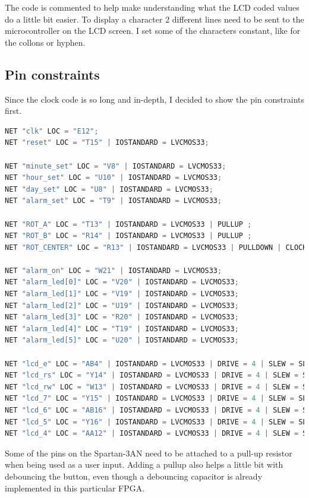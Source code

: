 \documentclass[12pt,a4paper,hidelinks]{article}            %
\begin{document}
The code is commented to help make understanding what the LCD coded values do a little bit easier. To display a character 2 different lines need to be sent to the microcontroller on the LCD screen. I set some of the characters constant, like for the collons or hyphen.

\subsection{Pin constraints}

Since the clock code is so long and in-depth, I decided to show the pin constraints first. 

\begin{lstlisting}[language=Verilog]
NET "clk" LOC = "E12";
NET "reset" LOC = "T15" | IOSTANDARD = LVCMOS33;

NET "minute_set" LOC = "V8" | IOSTANDARD = LVCMOS33;
NET "hour_set" LOC = "U10" | IOSTANDARD = LVCMOS33;
NET "day_set" LOC = "U8" | IOSTANDARD = LVCMOS33;
NET "alarm_set" LOC = "T9" | IOSTANDARD = LVCMOS33;

NET "ROT_A" LOC = "T13" | IOSTANDARD = LVCMOS33 | PULLUP ;
NET "ROT_B" LOC = "R14" | IOSTANDARD = LVCMOS33 | PULLUP ;
NET "ROT_CENTER" LOC = "R13" | IOSTANDARD = LVCMOS33 | PULLDOWN | CLOCK_DEDICATED_ROUTE = FALSE;

NET "alarm_on" LOC = "W21" | IOSTANDARD = LVCMOS33;
NET "alarm_led[0]" LOC = "V20" | IOSTANDARD = LVCMOS33;
NET "alarm_led[1]" LOC = "V19" | IOSTANDARD = LVCMOS33;
NET "alarm_led[2]" LOC = "U19" | IOSTANDARD = LVCMOS33;
NET "alarm_led[3]" LOC = "R20" | IOSTANDARD = LVCMOS33;
NET "alarm_led[4]" LOC = "T19" | IOSTANDARD = LVCMOS33;
NET "alarm_led[5]" LOC = "U20" | IOSTANDARD = LVCMOS33;

NET "lcd_e" LOC = "AB4" | IOSTANDARD = LVCMOS33 | DRIVE = 4 | SLEW = SLOW ;
NET "lcd_rs" LOC = "Y14" | IOSTANDARD = LVCMOS33 | DRIVE = 4 | SLEW = SLOW ;
NET "lcd_rw" LOC = "W13" | IOSTANDARD = LVCMOS33 | DRIVE = 4 | SLEW = SLOW ;
NET "lcd_7" LOC = "Y15" | IOSTANDARD = LVCMOS33 | DRIVE = 4 | SLEW = SLOW ;
NET "lcd_6" LOC = "AB16" | IOSTANDARD = LVCMOS33 | DRIVE = 4 | SLEW = SLOW ;
NET "lcd_5" LOC = "Y16" | IOSTANDARD = LVCMOS33 | DRIVE = 4 | SLEW = SLOW ;
NET "lcd_4" LOC = "AA12" | IOSTANDARD = LVCMOS33 | DRIVE = 4 | SLEW = SLOW ;
\end{lstlisting}

Some of the pins on the Spartan-3AN need to be attached to a pull-up resistor when being used as a user input. Adding a pullup also helps a little bit with debouncing the button, even though a debouncing capacitor is already implemented in this particular FPGA.
\end{document}
